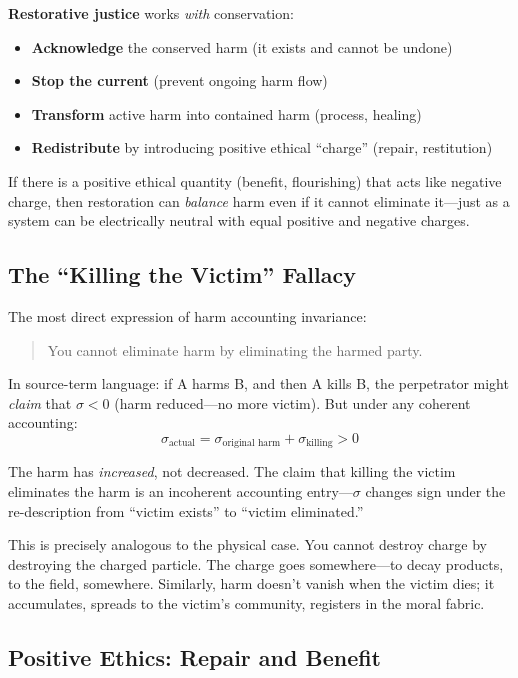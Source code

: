\documentclass[12pt,letterpaper]{article}
\theoremstyle{definition}
\theoremstyle{remark}
\begin{document}
\textbf{Restorative justice} works \textit{with} conservation:
\begin{itemize}
    \item \textbf{Acknowledge} the conserved harm (it exists and cannot be undone)
    \item \textbf{Stop the current} (prevent ongoing harm flow)
    \item \textbf{Transform} active harm into contained harm (process, healing)
    \item \textbf{Redistribute} by introducing positive ethical ``charge'' (repair, restitution)
\end{itemize}

If there is a positive ethical quantity (benefit, flourishing) that acts like negative charge, then restoration can \textit{balance} harm even if it cannot eliminate it---just as a system can be electrically neutral with equal positive and negative charges.

\subsection{The ``Killing the Victim'' Fallacy}

The most direct expression of harm accounting invariance:
\begin{quote}
You cannot eliminate harm by eliminating the harmed party.
\end{quote}

In source-term language: if A harms B, and then A kills B, the perpetrator might \textit{claim} that $\sigma < 0$ (harm reduced---no more victim). But under any coherent accounting:
\begin{equation}
\sigma_{\text{actual}} = \sigma_{\text{original harm}} + \sigma_{\text{killing}} > 0
\end{equation}

The harm has \textit{increased}, not decreased. The claim that killing the victim eliminates the harm is an incoherent accounting entry---$\sigma$ changes sign under the re-description from ``victim exists'' to ``victim eliminated.''

This is precisely analogous to the physical case. You cannot destroy charge by destroying the charged particle. The charge goes somewhere---to decay products, to the field, somewhere. Similarly, harm doesn't vanish when the victim dies; it accumulates, spreads to the victim's community, registers in the moral fabric.

\subsection{Positive Ethics: Repair and Benefit}
\end{document}
